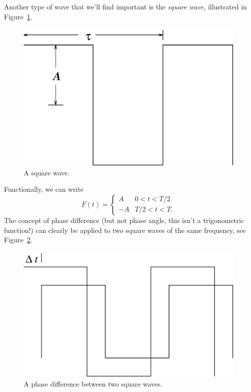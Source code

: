Another type of wave that we'll find important is the {\it square wave}, 
illustrated in Figure~\ref{fig:scope:squarewave}.
\begin{figure}[htb]
\centering \epsfxsize=8cm \includegraphics[scale=0.6]{4_oscilloscope/squarewave.eps}
\caption{A square wave.}
\label{fig:scope:squarewave}
\end{figure}
Functionally, we can write
$$ F(t) = \left\{ 
\begin{array}{cc} A & 0<t<T/2 \\ -A & T/2<t<T. \end{array} \right. $$
The concept of phase difference (but not phase angle, this isn't a 
trigonometric function!) can clearly be applied to two square waves of the same
frequency, see Figure~\ref{fig:scope:squarephase}.
\begin{figure}[htb]
\centering \epsfxsize=8cm \includegraphics[scale=0.6]{4_oscilloscope/squarephase.eps}
\caption{A phase difference between two square waves.}
\label{fig:scope:squarephase}
\end{figure}
